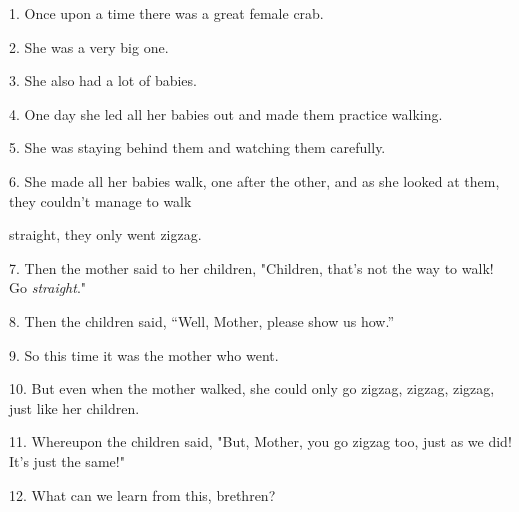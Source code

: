 \setcounter{footnote}{0}

1. Once upon a time there was a great female crab.

2. She was a very big one.

3. She also had a lot of babies.

4. One day she led all her babies out and made them practice walking.

5. She was staying behind them and watching them carefully.

6. She made all her babies walk, one after the other, and as she looked at them,
they couldn't manage to walk

straight, they only went zigzag.

7. Then the mother said to her children, "Children, that's not the way
to walk! Go \textit{straight}."

8. Then the children said, ``Well, Mother, please show us how.''

9. So this time it was the mother who went.

10. But even when the mother walked, she could only go zigzag, zigzag, zigzag,
just like her children.

11. Whereupon the children said, "But, Mother, you go zigzag too, just
as we did! It's just the same!"

12. What can we learn from this, brethren?

